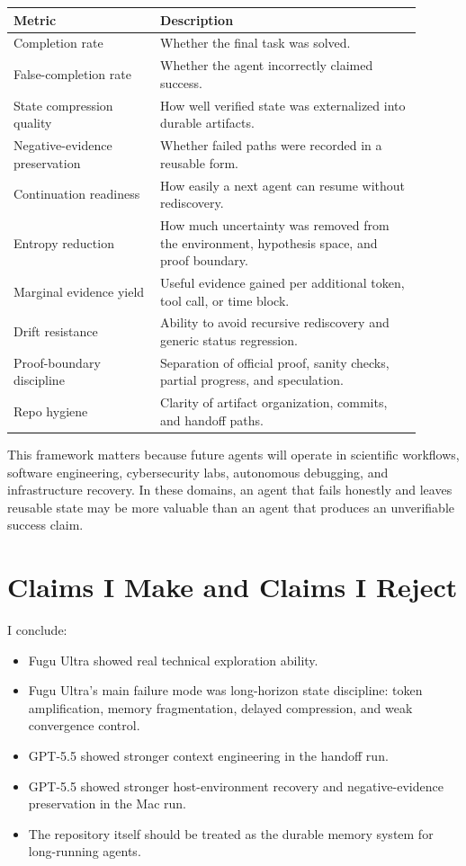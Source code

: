 \documentclass[a4paper,11pt]{article}
\begin{document}
\begin{longtable}{L{0.32\linewidth} L{0.58\linewidth}}
\toprule
Metric & Description\\
\midrule
Completion rate & Whether the final task was solved.\\
False-completion rate & Whether the agent incorrectly claimed success.\\
State compression quality & How well verified state was externalized into durable artifacts.\\
Negative-evidence preservation & Whether failed paths were recorded in a reusable form.\\
Continuation readiness & How easily a next agent can resume without rediscovery.\\
Entropy reduction & How much uncertainty was removed from the environment, hypothesis space, and proof boundary.\\
Marginal evidence yield & Useful evidence gained per additional token, tool call, or time block.\\
Drift resistance & Ability to avoid recursive rediscovery and generic status regression.\\
Proof-boundary discipline & Separation of official proof, sanity checks, partial progress, and speculation.\\
Repo hygiene & Clarity of artifact organization, commits, and handoff paths.\\
\bottomrule
\end{longtable}

This framework matters because future agents will operate in scientific workflows, software engineering, cybersecurity labs, autonomous debugging, and infrastructure recovery. In these domains, an agent that fails honestly and leaves reusable state may be more valuable than an agent that produces an unverifiable success claim.

\section{Claims I Make and Claims I Reject}

I conclude:

\begin{itemize}
  \item Fugu Ultra showed real technical exploration ability.
  \item Fugu Ultra's main failure mode was long-horizon state discipline: token amplification, memory fragmentation, delayed compression, and weak convergence control.
  \item GPT-5.5 showed stronger context engineering in the handoff run.
  \item GPT-5.5 showed stronger host-environment recovery and negative-evidence preservation in the Mac run.
  \item The repository itself should be treated as the durable memory system for long-running agents.
\end{itemize}
\end{document}
